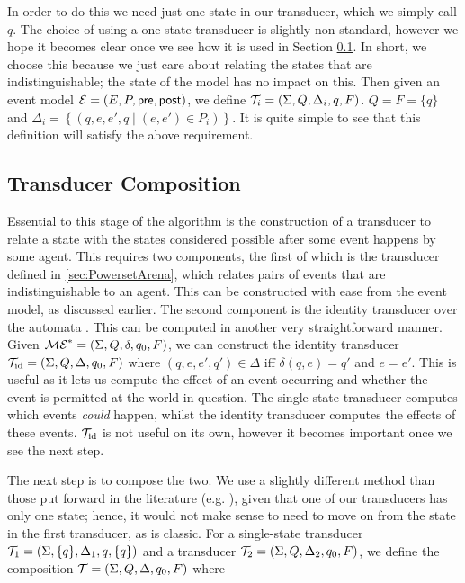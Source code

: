 \documentclass[10pt, a4paper]{report}
\begin{document}
In order to do this we need just one state in our transducer, which we simply
call $q$. The choice of using a one-state transducer is slightly non-standard,
however we hope it becomes clear once we see how it is used in Section
\ref{sec:TransducerComposition}. In short, we choose this because we just care
about relating the states that are indistinguishable; the state of the model has
no impact on this. Then given an event model $\mathcal{E} = (E, P, \textsf{pre}, \textsf{post})$, we
define $\mathcal{T}_i = (\Sigma, Q, \Delta_i, q, F)$. $Q = F = \{q\}$ and $\Delta_i =
\left\{ (q, e, e', q \mid (e, e') \in P_i) \right\}$. It is quite simple to see
that this definition will satisfy the above requirement.

\subsection{Transducer Composition}
\label{sec:TransducerComposition}

Essential to this stage of the algorithm is the construction of a transducer to
relate a state with the states considered possible after some event happens by
some agent. This requires two components, the first of which is the transducer
defined in \ref{sec:PowersetArena}, which relates pairs of events that are
indistinguishable to an agent. This can be constructed with ease from the event
model, as discussed earlier. The second component is the identity transducer
over the automata \mestar. This can be computed in another very straightforward
manner. Given $\mathcal{ME}^\ast = (\Sigma, Q, \delta, q_0, F)$, we can construct the
identity transducer $\mathcal{T}_{\text{id}} = (\Sigma, Q, \Delta, q_0, F)$ where
$(q, e, e', q') \in \Delta$ iff $\delta(q, e) = q'$ and $e = e'$. This is useful
as it lets us compute the effect of an event occurring and whether the event is
permitted at the world in question. The single-state transducer computes which
events \emph{could} happen, whilst the identity transducer computes the effects
of these events. $\mathcal{T}_{\text{id}}$ is not useful on its own, however it
becomes important once we see the next step.

The next step is to compose the two. We use a slightly different method than
those put forward in the literature (e.g. \cite{ComposingFSTs}), given that one of
our transducers has only one state; hence, it would not make sense to need to
move on from the state in the first transducer, as is classic. For a
single-state transducer $\mathcal{T}_1 = (\Sigma, \{q\}, \Delta_1, q, \{q\})$ and
a transducer $\mathcal{T}_2 = (\Sigma, Q, \Delta_2, q_0, F)$, we define the
composition $\mathcal{T} = (\Sigma, Q, \Delta, q_0, F)$ where 
\end{document}
